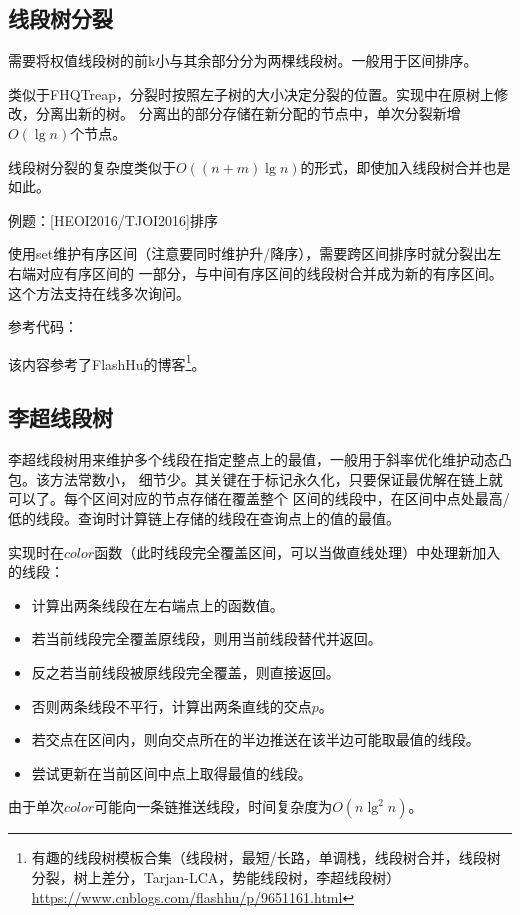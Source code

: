 \subsection{线段树分裂}
需要将权值线段树的前k小与其余部分分为两棵线段树。一般用于区间排序。

类似于FHQTreap，分裂时按照左子树的大小决定分裂的位置。实现中在原树上修改，分离出新的树。
分离出的部分存储在新分配的节点中，单次分裂新增$O(\lg n)$个节点。

线段树分裂的复杂度类似于$O((n+m)\lg n)$的形式，即使加入线段树合并也是如此。

例题：[HEOI2016/TJOI2016]排序

使用set维护有序区间（注意要同时维护升/降序），需要跨区间排序时就分裂出左右端对应有序区间的
一部分，与中间有序区间的线段树合并成为新的有序区间。这个方法支持在线多次询问。

参考代码：

该内容参考了FlashHu的博客\footnote{
    有趣的线段树模板合集（线段树，最短/长路，单调栈，线段树合并，线段树分裂，树上差分，Tarjan-LCA，势能线段树，李超线段树）\\
    \url{https://www.cnblogs.com/flashhu/p/9651161.html}
}。
\subsection{李超线段树}
李超线段树用来维护多个线段在指定整点上的最值，一般用于斜率优化维护动态凸包。该方法常数小，
细节少。其关键在于标记永久化，只要保证最优解在链上就可以了。每个区间对应的节点存储在覆盖整个
区间的线段中，在区间中点处最高/低的线段。查询时计算链上存储的线段在查询点上的值的最值。

实现时在$color$函数（此时线段完全覆盖区间，可以当做直线处理）中处理新加入的线段：
\begin{itemize}
    \item 计算出两条线段在左右端点上的函数值。
    \item 若当前线段完全覆盖原线段，则用当前线段替代并返回。
    \item 反之若当前线段被原线段完全覆盖，则直接返回。
    \item 否则两条线段不平行，计算出两条直线的交点$p$。
    \item 若交点在区间内，则向交点所在的半边推送在该半边可能取最值的线段。
    \item 尝试更新在当前区间中点上取得最值的线段。
\end{itemize}

由于单次$color$可能向一条链推送线段，时间复杂度为$O(n\lg^2 n)$。

